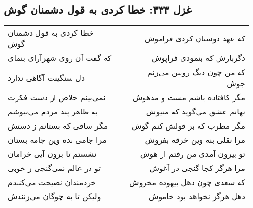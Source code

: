 \begin{center}
\section*{غزل ۳۳۳: خطا کردی به قول دشمنان گوش}
\label{sec:333}
\begin{longtable}{l p{0.5cm} r}
خطا کردی به قول دشمنان گوش
&&
که عهد دوستان کردی فراموش
\\
که گفت آن روی شهرآرای بنمای
&&
دگربارش که بنمودی فراپوش
\\
دل سنگینت آگاهی ندارد
&&
که من چون دیگ رویین می‌زنم جوش
\\
نمی‌بینم خلاص از دست فکرت
&&
مگر کافتاده باشم مست و مدهوش
\\
به ظاهر پند مردم می‌نیوشم
&&
نهانم عشق می‌گوید که منیوش
\\
مگر ساقی که بستانم ز دستش
&&
مگر مطرب که بر قولش کنم گوش
\\
مرا جامی بده وین جامه بستان
&&
مرا نقلی بنه وین خرقه بفروش
\\
نشستم تا برون آیی خرامان
&&
تو بیرون آمدی من رفتم از هوش
\\
تو در عالم نمی‌گنجی ز خوبی
&&
مرا هرگز کجا گنجی در آغوش
\\
خردمندان نصیحت می‌کنندم
&&
که سعدی چون دهل بیهوده مخروش
\\
ولیکن تا به چوگان می‌زنندش
&&
دهل هرگز نخواهد بود خاموش
\\
\end{longtable}
\end{center}
